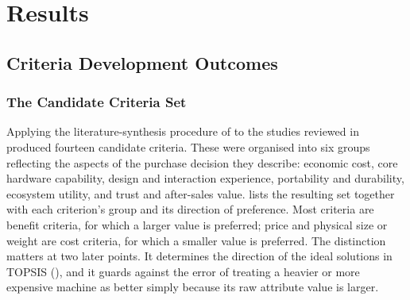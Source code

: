 \chapter{Results}\label{ch:results}


\section{Criteria Development Outcomes}\label{sec:criteria-outcome}

\subsection{The Candidate Criteria Set}\label{subsec:criteria-set}

Applying the literature-synthesis procedure of  to the studies
reviewed in  produced fourteen candidate criteria. These were
organised into six groups reflecting the aspects of the purchase decision they describe:
economic cost, core hardware capability, design and interaction experience, portability
and durability, ecosystem utility, and trust and after-sales value. 
lists the resulting set together with each criterion's group and its direction of
preference. Most criteria are benefit criteria, for which a larger value is preferred;
price and physical size or weight are cost criteria, for which a smaller value is
preferred. The distinction matters at two later points. It determines the direction of the
ideal solutions in TOPSIS (), and it guards against the error of treating
a heavier or more expensive machine as better simply because its raw attribute value is
larger.

